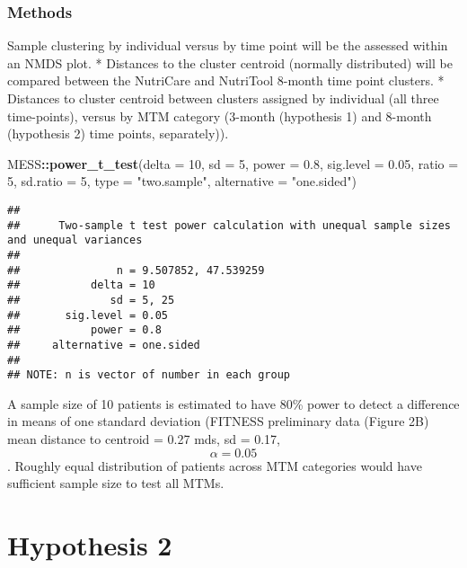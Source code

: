 \documentclass[]{article}
\newenvironment{Shaded}{\begin{snugshade}}{\end{snugshade}}
\newcommand{\DataTypeTok}[1]{\textcolor[rgb]{0.13,0.29,0.53}{#1}}
\newcommand{\DecValTok}[1]{\textcolor[rgb]{0.00,0.00,0.81}{#1}}
\newcommand{\FloatTok}[1]{\textcolor[rgb]{0.00,0.00,0.81}{#1}}
\newcommand{\KeywordTok}[1]{\textcolor[rgb]{0.13,0.29,0.53}{\textbf{#1}}}
\newcommand{\NormalTok}[1]{#1}
\newcommand{\OperatorTok}[1]{\textcolor[rgb]{0.81,0.36,0.00}{\textbf{#1}}}
\newcommand{\StringTok}[1]{\textcolor[rgb]{0.31,0.60,0.02}{#1}}
\begin{document}
\hypertarget{methods}{%
\subsubsection{Methods}\label{methods}}

Sample clustering by individual versus by time point will be the
assessed within an NMDS plot. * Distances to the cluster centroid
(normally distributed) will be compared between the NutriCare and
NutriTool 8-month time point clusters. * Distances to cluster centroid
between clusters assigned by individual (all three time-points), versus
by MTM category (3-month (hypothesis 1) and 8-month (hypothesis 2) time
points, separately)).

\begin{Shaded}
\begin{Highlighting}[]
\NormalTok{MESS}\OperatorTok{::}\KeywordTok{power_t_test}\NormalTok{(}\DataTypeTok{delta =} \DecValTok{10}\NormalTok{,}
             \DataTypeTok{sd =} \DecValTok{5}\NormalTok{, }
             \DataTypeTok{power =} \FloatTok{0.8}\NormalTok{, }
             \DataTypeTok{sig.level =} \FloatTok{0.05}\NormalTok{,}
             \DataTypeTok{ratio =} \DecValTok{5}\NormalTok{,}
             \DataTypeTok{sd.ratio =} \DecValTok{5}\NormalTok{,}
             \DataTypeTok{type =} \StringTok{"two.sample"}\NormalTok{,}
             \DataTypeTok{alternative =} \StringTok{"one.sided"}\NormalTok{)}
\end{Highlighting}
\end{Shaded}

\begin{verbatim}
## 
##      Two-sample t test power calculation with unequal sample sizes and unequal variances 
## 
##               n = 9.507852, 47.539259
##           delta = 10
##              sd = 5, 25
##       sig.level = 0.05
##           power = 0.8
##     alternative = one.sided
## 
## NOTE: n is vector of number in each group
\end{verbatim}

A sample size of 10 patients is estimated to have 80\% power to detect a
difference in means of one standard deviation (FITNESS preliminary data
(Figure 2B) mean distance to centroid = 0.27 mds, sd = 0.17,
\[\alpha = 0.05\]. Roughly equal distribution of patients across MTM
categories would have sufficient sample size to test all MTMs.

\hypertarget{hypothesis-2}{%
\section{Hypothesis 2}\label{hypothesis-2}}
\end{document}
